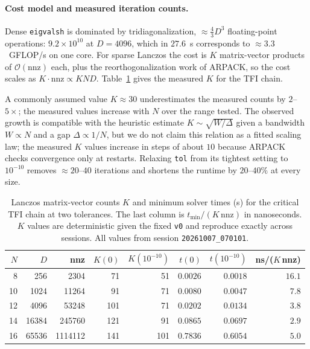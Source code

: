 \documentclass[pdflatex,sn-mathphys-num]{sn-jnl}
\begin{document}
\paragraph{Cost model and measured iteration counts.}
Dense \texttt{eigvalsh} is dominated by tridiagonalization,
$\approx\tfrac43 D^3$ floating-point operations: $9.2\times10^{10}$
at $D = 4096$, which in $27.6$~s corresponds to $\approx 3.3$~GFLOP/s
on one core. For sparse Lanczos the cost is $K$ matrix-vector
products of $\mathcal{O}(\mathrm{nnz})$ each, plus the
reorthogonalization work of ARPACK, so the cost scales as
$K \cdot \mathrm{nnz} \propto K N D$. Table~\ref{tab:matvec} gives
the measured $K$ for the TFI chain.

A commonly assumed value $K \approx 30$ underestimates the measured
counts by $2$--$5\times$; the measured values increase with $N$ over
the range tested. The observed growth is compatible with the
heuristic estimate $K \sim \sqrt{W/\Delta}$ given a bandwidth
$W \propto N$ and a gap $\Delta \propto 1/N$, but we do not claim
this relation as a fitted scaling law; the measured $K$ values
increase in steps of about $10$ because ARPACK checks convergence
only at restarts. Relaxing \texttt{tol} from its tightest setting to
$10^{-10}$ removes $\approx 20$--$40$ iterations and shortens the
runtime by $20$--$40\%$ at every size.

\begin{table}[t]
\centering
\small
\caption{Lanczos matrix-vector counts $K$ and minimum solver times
(s) for the critical TFI chain at two tolerances. The last column is
$t_{\min}/(K\,\mathrm{nnz})$ in nanoseconds. $K$ values are
deterministic given the fixed \texttt{v0} and reproduce exactly
across sessions. All values from session \texttt{20261007\_070101}.}
\label{tab:matvec}
\begin{tabular}{rrrrrrrr}
\toprule
$N$ & $D$ & nnz & $K(0)$ & $K(10^{-10})$ & $t(0)$ & $t(10^{-10})$ & ns/($K$\,nnz) \\
\midrule
8  & 256   & 2304    & 71  & 51  & $0.0026$ & $0.0018$ & $16.1$ \\
10 & 1024  & 11264   & 91  & 71  & $0.0080$ & $0.0047$ & $7.8$ \\
12 & 4096  & 53248   & 101 & 71  & $0.0202$ & $0.0134$ & $3.8$ \\
14 & 16384 & 245760  & 121 & 91  & $0.0865$ & $0.0697$ & $2.9$ \\
16 & 65536 & 1114112 & 141 & 101 & $0.7836$ & $0.6054$ & $5.0$ \\
\bottomrule
\end{tabular}
\end{table}
\end{document}

